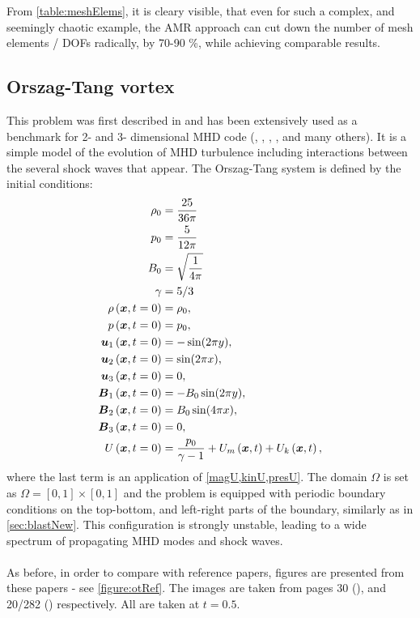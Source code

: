 From \cref{table:meshElems}, it is cleary visible, that even for such a complex, and seemingly chaotic example, the AMR approach can cut down the number of mesh elements / DOFs radically, by 70-90 \%, while achieving comparable results. 

\subsection{Orszag-Tang vortex}
This problem was first described in \cite{vortex} and has been extensively used as a benchmark for 2- and 3- dimensional MHD code (\cite{blast0}, \cite{blast1}, \cite{honzaFem}, \cite{otnew}, and many others). It is a simple model of the evolution of MHD turbulence including interactions between the several shock waves that appear. The Orszag-Tang system is defined by the initial conditions:
\begin{align}
\rho_0 & =  \frac{25}{36 \pi}\\ \nonumber
p_0 & =  \frac{5}{12 \pi}\\  \nonumber
B_0 & =  \sqrt{\frac{1}{4 \pi}}\\ \nonumber
\gamma & =  5 / 3\\ \nonumber
\rho\left(\mbox{\boldmath $x$}, t = 0\right) & =  \rho_0,\\ \nonumber
p\left(\mbox{\boldmath $x$}, t = 0\right) & =  p_0,\\ \nonumber
\mbox{\boldmath $u$}_1\left(\mbox{\boldmath $x$}, t = 0\right) & =  -\sin(2 \pi y),\\ \nonumber
\mbox{\boldmath $u$}_2\left(\mbox{\boldmath $x$}, t = 0\right) & =  \sin(2 \pi x),\\ \nonumber
\mbox{\boldmath $u$}_3\left(\mbox{\boldmath $x$}, t = 0\right) & =  0,\\ \nonumber
\mbox{\boldmath $B$}_1\left(\mbox{\boldmath $x$}, t = 0\right) & =  -B_0 \sin(2 \pi y),\\ \nonumber
\mbox{\boldmath $B$}_2\left(\mbox{\boldmath $x$}, t = 0\right) & =  B_0 \sin(4 \pi x),\\ \nonumber
\mbox{\boldmath $B$}_3\left(\mbox{\boldmath $x$}, t = 0\right) & =  0,\\ \nonumber
U\left(\mbox{\boldmath $x$}, t = 0\right) & =  \frac{p_0}{\gamma - 1} + U_m\left(\mbox{\boldmath $x$}, t\right) + U_k\left(\mbox{\boldmath $x$}, t\right),
\end{align}
where the last term is an application of \cref{magU,kinU,presU}. The domain $\Omega$ is set as $\Omega = [0, 1] \times [0, 1]$ and the problem is equipped with periodic boundary conditions on the top-bottom, and left-right parts of the boundary, similarly as in \cref{sec:blastNew}. This configuration is strongly unstable, leading to a wide spectrum of propagating MHD modes and shock waves.
\paragraph{}
As before, in order to compare with reference papers, figures are presented from these papers - see \cref{figure:otRef}. The images are taken from pages 30 (\cite{blast1}), and 20/282 (\cite{blast0}) respectively. All are taken at $t = 0.5$.

